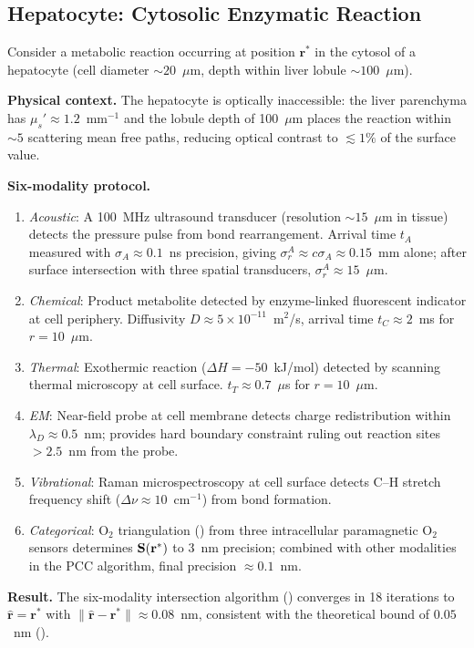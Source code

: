 \subsection{Hepatocyte: Cytosolic Enzymatic Reaction}

\begin{example}
\label{ex:hepatocyte}
Consider a metabolic reaction occurring at position $\mathbf{r}^*$ in the
cytosol of a hepatocyte (cell diameter $\sim 20$~$\mu$m, depth within liver
lobule $\sim 100$~$\mu$m).

\textbf{Physical context.}  The hepatocyte is optically inaccessible:
the liver parenchyma has $\mu_s' \approx 1.2$~mm$^{-1}$ and the lobule
depth of 100~$\mu$m places the reaction within $\sim 5$ scattering mean
free paths, reducing optical contrast to $\lesssim 1\%$ of the surface
value.

\textbf{Six-modality protocol.}
\begin{enumerate}[label=(\roman*), itemsep=2pt]
    \item \emph{Acoustic}: A 100~MHz ultrasound transducer (resolution
          $\sim 15$~$\mu$m in tissue) detects the pressure pulse from bond
          rearrangement.  Arrival time $t_A$ measured with $\sigma_A \approx
          0.1$~ns precision, giving $\sigma_r^A \approx c\sigma_A \approx
          0.15$~mm alone; after surface intersection with three spatial
          transducers, $\sigma_r^A \approx 15$~$\mu$m.
    \item \emph{Chemical}: Product metabolite detected by enzyme-linked
          fluorescent indicator at cell periphery.  Diffusivity
          $D \approx 5 \times 10^{-11}$~m$^2$/s, arrival time $t_C \approx
          2$~ms for $r = 10$~$\mu$m.
    \item \emph{Thermal}: Exothermic reaction ($\Delta H = -50$~kJ/mol)
          detected by scanning thermal microscopy at cell surface.
          $t_T \approx 0.7$~$\mu$s for $r = 10$~$\mu$m.
    \item \emph{EM}: Near-field probe at cell membrane detects charge
          redistribution within $\lambda_D \approx 0.5$~nm; provides hard
          boundary constraint ruling out reaction sites $>2.5$~nm from
          the probe.
    \item \emph{Vibrational}: Raman microspectroscopy at cell surface
          detects C--H stretch frequency shift ($\Delta\nu \approx 10$~cm$^{-1}$)
          from bond formation.
    \item \emph{Categorical}: O$_2$ triangulation
          () from three intracellular paramagnetic O$_2$
          sensors determines $\mathbf{S}(\mathbf{r}^*)$ to 3~nm precision;
          combined with other modalities in the PCC algorithm, final
          precision $\approx 0.1$~nm.
\end{enumerate}

\textbf{Result.}  The six-modality intersection algorithm
() converges in 18 iterations to
$\hat{\mathbf{r}} = \mathbf{r}^*$ with $\|\hat{\mathbf{r}} - \mathbf{r}^*\|
\approx 0.08$~nm, consistent with the theoretical bound of $0.05$~nm
().
\end{example}

